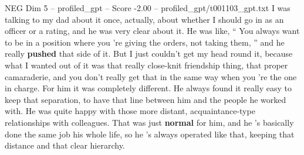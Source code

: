 \begin{textsample}{NEG Dim 5 – profiled\_gpt – Score -2.00 – profiled\_gpt/t001103\_gpt.txt}  \label{ex:f5_neg_022}
I was talking to my dad about it once, actually, about whether I should go in as an officer or a rating, and he was very clear about it.
He was like, “ You always want to be in a position where you ’re giving the orders, not taking them, ” and he really \textbf{pushed} that side of it.
But I just couldn't get my head round it, because what I wanted out of it was that really close-knit friendship thing, that proper camaraderie, and you don't really get that in the same way when you ’re the one in charge.
For him it was completely different.
He always found it really easy to keep that separation, to have that line between him and the people he worked with.
He was quite happy with those more distant, acquaintance-type relationships with colleagues.
That was just \textbf{normal} for him, and he ’s basically done the same job his whole life, so he ’s always operated like that, keeping that distance and that clear hierarchy.

\end{textsample}
